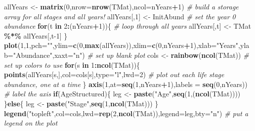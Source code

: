 \documentclass[
]{article}
\newenvironment{Shaded}{\begin{snugshade}}{\end{snugshade}}
\newcommand{\AttributeTok}[1]{\textcolor[rgb]{0.13,0.29,0.53}{#1}}
\newcommand{\CommentTok}[1]{\textcolor[rgb]{0.56,0.35,0.01}{\textit{#1}}}
\newcommand{\ControlFlowTok}[1]{\textcolor[rgb]{0.13,0.29,0.53}{\textbf{#1}}}
\newcommand{\DecValTok}[1]{\textcolor[rgb]{0.00,0.00,0.81}{#1}}
\newcommand{\FunctionTok}[1]{\textcolor[rgb]{0.13,0.29,0.53}{\textbf{#1}}}
\newcommand{\NormalTok}[1]{#1}
\newcommand{\OtherTok}[1]{\textcolor[rgb]{0.56,0.35,0.01}{#1}}
\newcommand{\SpecialCharTok}[1]{\textcolor[rgb]{0.81,0.36,0.00}{\textbf{#1}}}
\newcommand{\StringTok}[1]{\textcolor[rgb]{0.31,0.60,0.02}{#1}}
\begin{document}
\begin{Shaded}
\begin{Highlighting}[]
\NormalTok{allYears }\OtherTok{\textless{}{-}} \FunctionTok{matrix}\NormalTok{(}\DecValTok{0}\NormalTok{,}\AttributeTok{nrow=}\FunctionTok{nrow}\NormalTok{(TMat),}\AttributeTok{ncol=}\NormalTok{nYears}\SpecialCharTok{+}\DecValTok{1}\NormalTok{)     }\CommentTok{\# build a storage array for all stages and all years!}
\NormalTok{allYears[,}\DecValTok{1}\NormalTok{] }\OtherTok{\textless{}{-}}\NormalTok{ InitAbund  }\CommentTok{\# set the year 0 abundance                                    }
\ControlFlowTok{for}\NormalTok{(t }\ControlFlowTok{in} \DecValTok{2}\SpecialCharTok{:}\NormalTok{(nYears}\SpecialCharTok{+}\DecValTok{1}\NormalTok{))\{   }\CommentTok{\# loop through all years}
\NormalTok{  allYears[,t] }\OtherTok{\textless{}{-}}\NormalTok{  TMat }\SpecialCharTok{\%*\%}\NormalTok{ allYears[,t}\DecValTok{{-}1}\NormalTok{]}
\NormalTok{\}}
\FunctionTok{plot}\NormalTok{(}\DecValTok{1}\NormalTok{,}\DecValTok{1}\NormalTok{,}\AttributeTok{pch=}\StringTok{""}\NormalTok{,}\AttributeTok{ylim=}\FunctionTok{c}\NormalTok{(}\DecValTok{0}\NormalTok{,}\FunctionTok{max}\NormalTok{(allYears)),}\AttributeTok{xlim=}\FunctionTok{c}\NormalTok{(}\DecValTok{0}\NormalTok{,nYears}\SpecialCharTok{+}\DecValTok{1}\NormalTok{),}\AttributeTok{xlab=}\StringTok{"Years"}\NormalTok{,}\AttributeTok{ylab=}\StringTok{"Abundance"}\NormalTok{,}\AttributeTok{xaxt=}\StringTok{"n"}\NormalTok{)  }\CommentTok{\# set up blank plot}
\NormalTok{cols }\OtherTok{\textless{}{-}} \FunctionTok{rainbow}\NormalTok{(}\FunctionTok{ncol}\NormalTok{(TMat))    }\CommentTok{\# set up colors to use}
\ControlFlowTok{for}\NormalTok{(s }\ControlFlowTok{in} \DecValTok{1}\SpecialCharTok{:}\FunctionTok{ncol}\NormalTok{(TMat))\{}
  \FunctionTok{points}\NormalTok{(allYears[s,],}\AttributeTok{col=}\NormalTok{cols[s],}\AttributeTok{type=}\StringTok{"l"}\NormalTok{,}\AttributeTok{lwd=}\DecValTok{2}\NormalTok{)     }\CommentTok{\# plot out each life stage abundance, one at a time}
\NormalTok{\}}
\FunctionTok{axis}\NormalTok{(}\DecValTok{1}\NormalTok{,}\AttributeTok{at=}\FunctionTok{seq}\NormalTok{(}\DecValTok{1}\NormalTok{,nYears}\SpecialCharTok{+}\DecValTok{1}\NormalTok{),}\AttributeTok{labels =} \FunctionTok{seq}\NormalTok{(}\DecValTok{0}\NormalTok{,nYears))   }\CommentTok{\# label the axis}
\ControlFlowTok{if}\NormalTok{(AgeStructured)\{}
\NormalTok{  leg }\OtherTok{\textless{}{-}}  \FunctionTok{paste}\NormalTok{(}\StringTok{"Age"}\NormalTok{,}\FunctionTok{seq}\NormalTok{(}\DecValTok{1}\NormalTok{,(}\FunctionTok{ncol}\NormalTok{(TMat))))}
\NormalTok{\}}\ControlFlowTok{else}\NormalTok{\{}
\NormalTok{  leg }\OtherTok{\textless{}{-}} \FunctionTok{paste}\NormalTok{(}\StringTok{"Stage"}\NormalTok{,}\FunctionTok{seq}\NormalTok{(}\DecValTok{1}\NormalTok{,}\FunctionTok{ncol}\NormalTok{(TMat))) }
\NormalTok{\}}
\FunctionTok{legend}\NormalTok{(}\StringTok{"topleft"}\NormalTok{,}\AttributeTok{col=}\NormalTok{cols,}\AttributeTok{lwd=}\FunctionTok{rep}\NormalTok{(}\DecValTok{2}\NormalTok{,}\FunctionTok{ncol}\NormalTok{(TMat)),}\AttributeTok{legend=}\NormalTok{leg,}\AttributeTok{bty=}\StringTok{"n"}\NormalTok{)  }\CommentTok{\# put a legend on the plot}
\end{Highlighting}
\end{Shaded}
\end{document}
